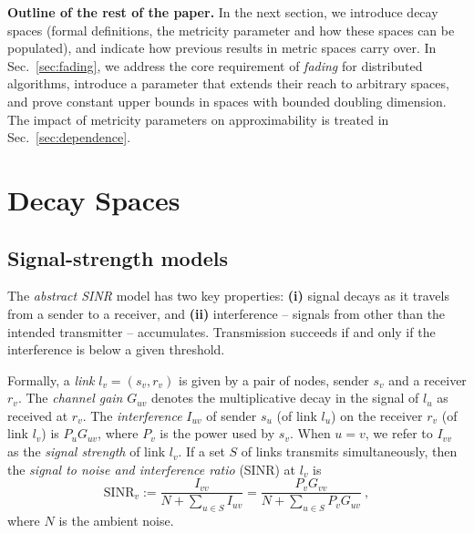 \documentclass[11pt]{amsart}
\newcommand{\mypara}[1]{\smallskip\noindent\textbf{#1.}}  \newcommand{\tightpara}[1]{\noindent\textbf{#1.}}  \newcommand{\inddim}{D}
\begin{document}
\iffalse

\begin{quote}
\emph{To do: Expand discussion on the validity of these assumptions}
Summary: geometric is basically always way off; additivity and
thresholding are close approximations. Cite ICDCS and others.
\end{quote}
\fi

\mypara{Outline of the rest of the paper}
In the next section, we introduce decay spaces (formal definitions, the metricity parameter and how these spaces can be populated),
and indicate how previous results in metric spaces carry over.
In Sec.~\ref{sec:fading}, we address the core requirement of \emph{fading} for distributed algorithms, introduce a parameter that extends their reach to arbitrary spaces, and prove constant upper bounds in spaces with bounded doubling dimension.
The impact of metricity parameters on approximability is treated in Sec.~\ref{sec:dependence}.

\section{Decay Spaces}
\label{sec:models}

\subsection{Signal-strength models}
\label{sec:ss}

The \emph{abstract SINR} model has two key properties:
\textbf{(i)} signal decays as it travels from a sender to a receiver,
and \textbf{(ii)} interference -- signals from other than the intended transmitter -- accumulates.
Transmission succeeds if and only if the interference is below a given threshold.

Formally, a \emph{link} $l_v = (s_v, r_v)$ is given by a pair of
nodes, sender $s_v$ and a receiver $r_v$.  The \emph{channel gain} $G_{uv}$ denotes the multiplicative
decay in the signal of $l_u$ as received at $r_v$.  The
\emph{interference} $I_{uv}$ of sender $s_{u}$ (of link $l_u$) on 
the receiver $r_v$ (of link $l_v$) is $P_u G_{uv}$,
where $P_v$ is the power used by $s_v$.
When $u=v$, we refer to $I_{vv}$ as the \emph{signal strength} of link $l_v$.
If a set $S$ of
links transmits simultaneously, then the \emph{signal to noise and
  interference ratio} (SINR) at $l_v$ is
\begin{equation}
 \text{SINR}_v := \frac{I_{vv}}{N + \sum_{u \in S} I_{uv}} = 
   \frac{P_v G_{vv}}{N + \sum_{u \in S} P_v G_{uv}}\ ,
\label{eqn:sinr}
\end{equation}
where $N$ is the ambient noise.
\end{document}
